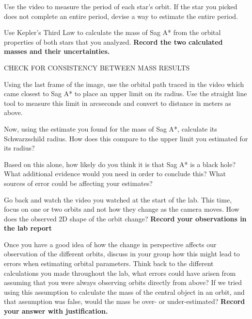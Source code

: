\begin{steps}
	\item Use the video to measure the period of each star's orbit. If the star you picked does not complete an entire period, devise a way to estimate the entire period.

	\item Use Kepler's Third Law to calculate the mass of Sag A* from the orbital properties of both stars that you analyzed. \textbf{Record the two calculated masses and their uncertainties.}
	
	\item CHECK FOR CONSISTENCY BETWEEN MASS RESULTS
	
	\item Using the last frame of the image, use the orbital path traced in the video which came closest to Sag A* to place an upper limit on its radius. Use the straight line tool to measure this limit in arcseconds and convert to distance in meters as above.

	\item Now, using the estimate you found for the mass of Sag A*, calculate its Schwarzschild radius. How does this compare to the upper limit you estimated for its radius? 
	
	\item Based on this alone, how likely do you think it is that Sag A* is a black hole? What additional evidence would you need in order to conclude this? What sources of error could be affecting your estimates? 
	
	\item Go back and watch the video you watched at the start of the lab. This time, focus on one or two orbits and not how they change as the camera moves. How does the observed 2D shape of the orbit change? \textbf{Record your observations in the lab report}
	
	\item Once you have a good idea of how the change in perspective affects our observation of the different orbits, discuss in your group how this might lead to errors when estimating orbital parameters. Think back to the different calculations you made throughout the lab, what errors could have arisen from assuming that you were always observing orbits directly from above? If we tried using this assumption to calculate the mass of the central object in an orbit, and that assumption was false, would the mass be over- or under-estimated? \textbf{Record your answer with justification.}

\end{steps}


